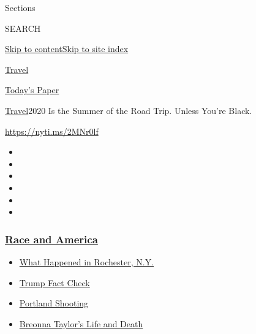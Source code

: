 Sections

SEARCH

\protect\hyperlink{site-content}{Skip to
content}\protect\hyperlink{site-index}{Skip to site index}

\href{https://www.nytimes3xbfgragh.onion/section/travel}{Travel}

\href{https://myaccount.nytimes3xbfgragh.onion/auth/login?response_type=cookie\&client_id=vi}{}

\href{https://www.nytimes3xbfgragh.onion/section/todayspaper}{Today's
Paper}

\href{/section/travel}{Travel}\textbar{}2020 Is the Summer of the Road
Trip. Unless You're Black.

\url{https://nyti.ms/2MNr0lf}

\begin{itemize}
\item
\item
\item
\item
\item
\item
\end{itemize}

\hypertarget{race-and-america}{%
\subsubsection{\texorpdfstring{\href{https://www.nytimes3xbfgragh.onion/news-event/george-floyd-protests-minneapolis-new-york-los-angeles?name=styln-george-floyd\&region=TOP_BANNER\&block=storyline_menu_recirc\&action=click\&pgtype=Article\&impression_id=e0ac4b40-f1f9-11ea-8c13-f5b785c7d6f4\&variant=undefined}{Race
and America}}{Race and America}}\label{race-and-america}}

\begin{itemize}
\tightlist
\item
  \href{https://www.nytimes3xbfgragh.onion/2020/09/04/nyregion/rochester-police-daniel-prude.html?name=styln-george-floyd\&region=TOP_BANNER\&block=storyline_menu_recirc\&action=click\&pgtype=Article\&impression_id=e0ac4b41-f1f9-11ea-8c13-f5b785c7d6f4\&variant=undefined}{What
  Happened in Rochester, N.Y.}
\item
  \href{https://www.nytimes3xbfgragh.onion/2020/09/01/us/politics/trump-fact-check-protests.html?name=styln-george-floyd\&region=TOP_BANNER\&block=storyline_menu_recirc\&action=click\&pgtype=Article\&impression_id=e0ac4b42-f1f9-11ea-8c13-f5b785c7d6f4\&variant=undefined}{Trump
  Fact Check}
\item
  \href{https://www.nytimes3xbfgragh.onion/2020/08/30/us/portland-shooting-explained.html?name=styln-george-floyd\&region=TOP_BANNER\&block=storyline_menu_recirc\&action=click\&pgtype=Article\&impression_id=e0ac4b43-f1f9-11ea-8c13-f5b785c7d6f4\&variant=undefined}{Portland
  Shooting}
\item
  \href{https://www.nytimes3xbfgragh.onion/2020/08/30/us/breonna-taylor-police-killing.html?name=styln-george-floyd\&region=TOP_BANNER\&block=storyline_menu_recirc\&action=click\&pgtype=Article\&impression_id=e0ac4b44-f1f9-11ea-8c13-f5b785c7d6f4\&variant=undefined}{Breonna
  Taylor's Life and Death}
\end{itemize}

